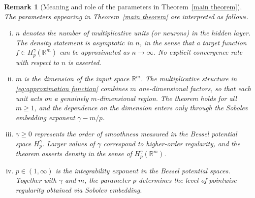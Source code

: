 \documentclass[11pt,reqno]{amsart}
\numberwithin{equation}{section}
\newtheorem{remark}[theorem]{\bf{Remark}}
\theoremstyle{remark}
\theoremstyle{definition}
\newcommand\bR{\mathbb{R}}
\begin{document}
\begin{remark}[Meaning and role of the parameters in Theorem~\ref{main theorem}]
\label{rem:meaning-parameters}
The parameters appearing in Theorem~\ref{main theorem} are interpreted as follows.

\begin{enumerate}[(i)]
    \item $n$ denotes the number of multiplicative units (or neurons) in the hidden layer.
    The density statement is asymptotic in $n$, in the sense that a target function
    $f \in H_p^\gamma(\mathbb{R}^m)$ can be approximated as $n \to \infty$.
    No explicit convergence rate with respect to $n$ is asserted.

    \item $m$ is the dimension of the input space $\mathbb{R}^m$.
    The multiplicative structure in \eqref{eq:approximation function} combines $m$
    one-dimensional factors, so that each unit acts on a genuinely $m$-dimensional region.
    The theorem holds for all $m \ge 1$, and the dependence on the dimension enters only
    through the Sobolev embedding exponent $\gamma - m/p$.

    \item $\gamma \ge 0$ represents the order of smoothness measured in the Bessel potential space $H_p^\gamma$. Larger values of $\gamma$ correspond to higher-order regularity, and the theorem asserts density in the sense of $H_{p}^{\gamma}(\bR^{m})$. 

    \item $p \in (1,\infty)$ is the integrability exponent in the Bessel potential spaces.
    Together with $\gamma$ and $m$, the parameter $p$ determines the level of pointwise regularity obtained via Sobolev embedding. 
\end{enumerate}
\end{remark}
\end{document}
